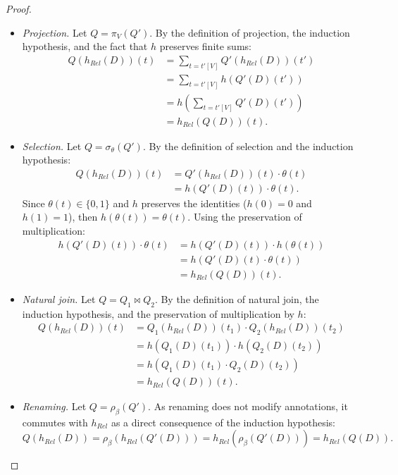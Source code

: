 \documentclass[oneside, 11pt]{amsbook}
\theoremstyle{plain}
\theoremstyle{definition}
\theoremstyle{remark}
\begin{document}
\begin{proof}
\begin{itemize}
        \item \emph{Projection.}
              Let $Q = \pi_V(Q')$. By the definition of projection, the induction hypothesis, and the fact that $h$ preserves finite sums:
              \begin{align*}
                  Q(h_{Rel}(D))(t) & = \sum_{t=t'[V]} Q'(h_{Rel}(D))(t')        \\
                                   & = \sum_{t=t'[V]} h(Q'(D)(t'))              \\
                                   & = h\left( \sum_{t=t'[V]} Q'(D)(t') \right) \\
                                   & = h_{Rel}(Q(D))(t).
              \end{align*}

        \item \emph{Selection.}
              Let $Q = \sigma_\theta(Q')$. By the definition of selection and the induction hypothesis:
              \begin{align*}
                  Q(h_{Rel}(D))(t) & = Q'(h_{Rel}(D))(t) \cdot \theta(t) \\
                                   & = h(Q'(D)(t)) \cdot \theta(t).
              \end{align*}
              Since $\theta(t) \in \{0, 1\}$ and $h$ preserves the identities ($h(0)=0$ and $h(1)=1$), then $h(\theta(t)) = \theta(t)$. Using the preservation of multiplication:
              \begin{align*}
                  h(Q'(D)(t)) \cdot \theta(t) & = h(Q'(D)(t)) \cdot h(\theta(t)) \\
                                              & = h(Q'(D)(t) \cdot \theta(t))    \\
                                              & = h_{Rel}(Q(D))(t).
              \end{align*}

        \item \emph{Natural join.}
              Let $Q = Q_1 \bowtie Q_2$. By the definition of natural join, the induction hypothesis, and the preservation of multiplication by $h$:
              \begin{align*}
                  Q(h_{Rel}(D))(t) & = Q_1(h_{Rel}(D))(t_1) \cdot Q_2(h_{Rel}(D))(t_2) \\
                                   & = h(Q_1(D)(t_1)) \cdot h(Q_2(D)(t_2))             \\
                                   & = h(Q_1(D)(t_1) \cdot Q_2(D)(t_2))                \\
                                   & = h_{Rel}(Q(D))(t).
              \end{align*}

        \item \emph{Renaming.}
              Let $Q = \rho_\beta(Q')$. As renaming does not modify annotations, it commutes with $h_{Rel}$ as a direct consequence of the induction hypothesis:
              \[
                  Q(h_{Rel}(D)) = \rho_\beta(h_{Rel}(Q'(D))) = h_{Rel}(\rho_\beta(Q'(D))) = h_{Rel}(Q(D)).
              \]
    \end{itemize}
\end{proof}
\end{document}
